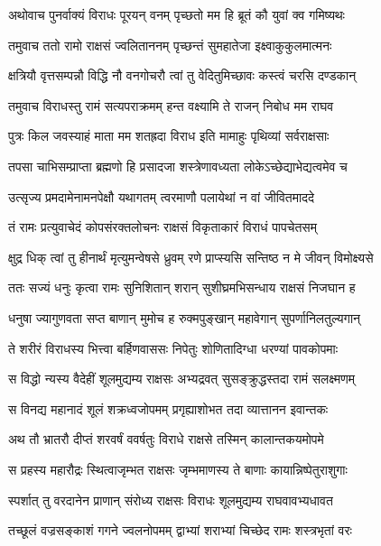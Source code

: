 
\twolineshloka
{अथोवाच पुनर्वाक्यं विराधः पूरयन् वनम्}
{पृच्छतो मम हि ब्रूतं कौ युवां क्व गमिष्यथः} %

\twolineshloka
{तमुवाच ततो रामो राक्षसं ज्वलिताननम्}
{पृच्छन्तं सुमहातेजा इक्ष्वाकुकुलमात्मनः} %

\twolineshloka
{क्षत्रियौ वृत्तसम्पन्नौ विद्धि नौ वनगोचरौ}
{त्वां तु वेदितुमिच्छावः कस्त्वं चरसि दण्डकान्} %

\twolineshloka
{तमुवाच विराधस्तु रामं सत्यपराक्रमम्}
{हन्त वक्ष्यामि ते राजन् निबोध मम राघव} %

\twolineshloka
{पुत्रः किल जवस्याहं माता मम शतह्रदा}
{विराध इति मामाहुः पृथिव्यां सर्वराक्षसाः} %

\twolineshloka
{तपसा चाभिसम्प्राप्ता ब्रह्मणो हि प्रसादजा}
{शस्त्रेणावध्यता लोकेऽच्छेद्याभेद्यत्वमेव च} %

\twolineshloka
{उत्सृज्य प्रमदामेनामनपेक्षौ यथागतम्}
{त्वरमाणौ पलायेथां न वां जीवितमाददे} %

\twolineshloka
{तं रामः प्रत्युवाचेदं कोपसंरक्तलोचनः}
{राक्षसं विकृताकारं विराधं पापचेतसम्} %

\twolineshloka
{क्षुद्र धिक् त्वां तु हीनार्थं मृत्युमन्वेषसे ध्रुवम्}
{रणे प्राप्स्यसि सन्तिष्ठ न मे जीवन् विमोक्ष्यसे} %

\twolineshloka
{ततः सज्यं धनुः कृत्वा रामः सुनिशितान् शरान्}
{सुशीघ्रमभिसन्धाय राक्षसं निजघान ह} %

\twolineshloka
{धनुषा ज्यागुणवता सप्त बाणान् मुमोच ह}
{रुक्मपुङ्खान् महावेगान् सुपर्णानिलतुल्यगान्} %

\twolineshloka
{ते शरीरं विराधस्य भित्त्वा बर्हिणवाससः}
{निपेतुः शोणितादिग्धा धरण्यां पावकोपमाः} %

\twolineshloka
{स विद्धो न्यस्य वैदेहीं शूलमुद्यम्य राक्षसः}
{अभ्यद्रवत् सुसङ्क्रुद्धस्तदा रामं सलक्ष्मणम्} %

\twolineshloka
{स विनद्य महानादं शूलं शक्रध्वजोपमम्}
{प्रगृह्याशोभत तदा व्यात्तानन इवान्तकः} %

\twolineshloka
{अथ तौ भ्रातरौ दीप्तं शरवर्षं ववर्षतुः}
{विराधे राक्षसे तस्मिन् कालान्तकयमोपमे} %

\twolineshloka
{स प्रहस्य महारौद्रः स्थित्वाजृम्भत राक्षसः}
{जृम्भमाणस्य ते बाणाः कायान्निष्पेतुराशुगाः} %

\twolineshloka
{स्पर्शात् तु वरदानेन प्राणान् संरोध्य राक्षसः}
{विराधः शूलमुद्यम्य राघवावभ्यधावत} %

\twolineshloka
{तच्छूलं वज्रसङ्काशं गगने ज्वलनोपमम्}
{द्वाभ्यां शराभ्यां चिच्छेद रामः शस्त्रभृतां वरः} %

